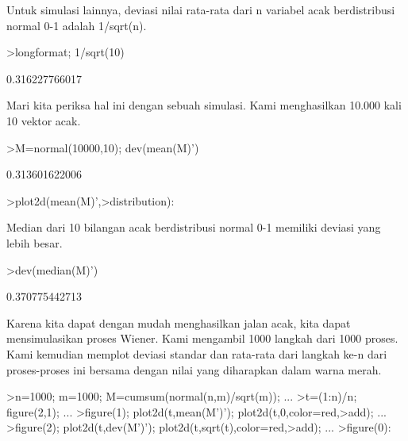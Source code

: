 \documentclass[a4paper,10pt]{article}
\begin{document}
\begin{eulernotebook}
\begin{eulercomment}
\begin{eulercomment}
\begin{eulercomment}
\begin{eulercomment}
\begin{eulercomment}
\begin{eulercomment}
\begin{eulercomment}
\begin{eulercomment}
\begin{eulercomment}
\begin{eulercomment}
\begin{eulercomment}
\begin{eulercomment}
\begin{eulercomment}
\begin{eulercomment}
\begin{eulercomment}
\begin{eulercomment}
\begin{eulercomment}
\begin{eulercomment}
\begin{eulercomment}
Untuk simulasi lainnya, deviasi nilai rata-rata dari n variabel acak
berdistribusi normal 0-1 adalah 1/sqrt(n).
\end{eulercomment}
\begin{eulerprompt}
>longformat; 1/sqrt(10)
\end{eulerprompt}
\begin{euleroutput}
  0.316227766017
\end{euleroutput}
\begin{eulercomment}
Mari kita periksa hal ini dengan sebuah simulasi. Kami menghasilkan
10.000 kali 10 vektor acak.
\end{eulercomment}
\begin{eulerprompt}
>M=normal(10000,10); dev(mean(M)')
\end{eulerprompt}
\begin{euleroutput}
  0.313601622006
\end{euleroutput}
\begin{eulerprompt}
>plot2d(mean(M)',>distribution):
\end{eulerprompt}
\begin{eulercomment}
Median dari 10 bilangan acak berdistribusi normal 0-1 memiliki deviasi
yang lebih besar.
\end{eulercomment}
\begin{eulerprompt}
>dev(median(M)')
\end{eulerprompt}
\begin{euleroutput}
  0.370775442713
\end{euleroutput}
\begin{eulercomment}
Karena kita dapat dengan mudah menghasilkan jalan acak, kita dapat
mensimulasikan proses Wiener. Kami mengambil 1000 langkah dari 1000
proses. Kami kemudian memplot deviasi standar dan rata-rata dari
langkah ke-n dari proses-proses ini bersama dengan nilai yang
diharapkan dalam warna merah.
\end{eulercomment}
\begin{eulerprompt}
>n=1000; m=1000; M=cumsum(normal(n,m)/sqrt(m)); ...
>t=(1:n)/n; figure(2,1); ...
>figure(1); plot2d(t,mean(M')'); plot2d(t,0,color=red,>add); ...
>figure(2); plot2d(t,dev(M')'); plot2d(t,sqrt(t),color=red,>add); ...
>figure(0):
\end{eulerprompt}
\begin{eulercomment}

\end{eulercomment}
\end{eulercomment}
\end{eulercomment}
\end{eulercomment}
\end{eulercomment}
\end{eulercomment}
\end{eulercomment}
\end{eulercomment}
\end{eulercomment}
\end{eulercomment}
\end{eulercomment}
\end{eulercomment}
\end{eulercomment}
\end{eulercomment}
\end{eulercomment}
\end{eulercomment}
\end{eulercomment}
\end{eulercomment}
\end{eulercomment}
\end{eulernotebook}
\end{document}
